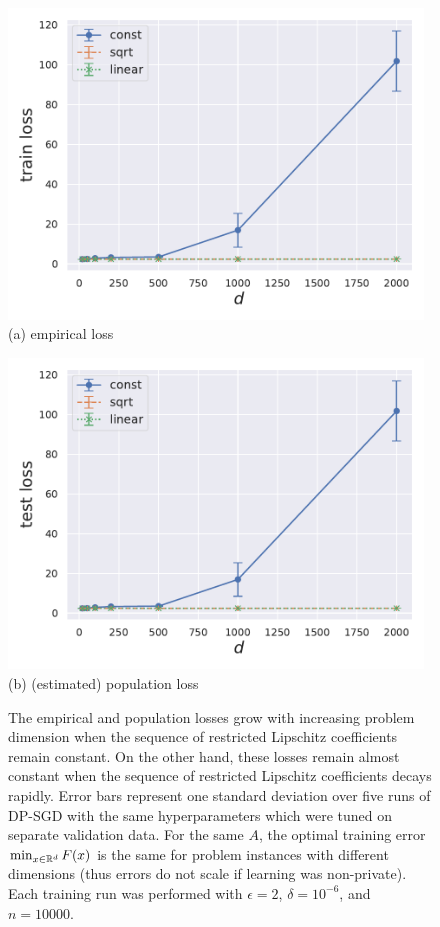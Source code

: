 \begin{figure}[t]
\begin{center}
\begin{minipage}[t]{0.48\linewidth}
\centering
{\includegraphics[width=0.98\textwidth]{figs/synthetic/trplot.pdf}}
(a) empirical loss
\end{minipage}
\begin{minipage}[t]{0.48\linewidth}
\centering
{\includegraphics[width=0.98\textwidth]{figs/synthetic/teplot.pdf}}
(b) (estimated) population loss
\end{minipage}
\end{center}
\caption{
The empirical and population losses grow with increasing problem dimension when the sequence of restricted Lipschitz coefficients remain constant. On the other hand, these losses remain almost constant when the sequence of restricted Lipschitz coefficients decays rapidly.
Error bars represent one standard deviation over five runs of DP-SGD with the same hyperparameters which were tuned on separate validation data.
For the same $A$, the optimal training error $\min_{x\in\mathbb{R}^d} F(x)$ is the same for problem instances with different dimensions (thus errors do not scale if learning was non-private).
Each training run was performed with $\epsilon=2$, $\delta=10^{-6}$, and $n=10000$. 
}
\label{fig:toy}
\end{figure}

